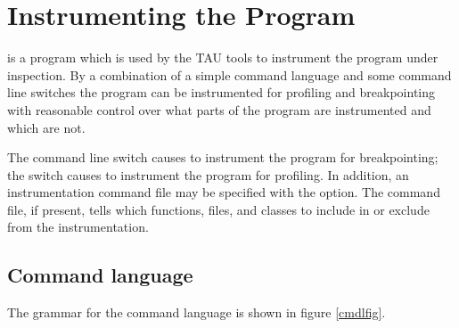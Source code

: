 \section{Instrumenting the Program}

 is a program which is used by the TAU tools to instrument
the program under inspection. By a combination of a simple command language 
and some command line switches the program can be instrumented for 
profiling and breakpointing with reasonable control over what parts
of the program are instrumented and which are not.

The command line switch  causes  to
instrument the program for breakpointing; the switch 
causes  to instrument the program for profiling. In
addition, an instrumentation command file may be specified with the
 option.  The command file, if present, tells
 which functions, files, and classes to include in or
exclude from the instrumentation.

\subsection{Command language}

The grammar for the command language is shown in figure \ref{cmdlfig}.

